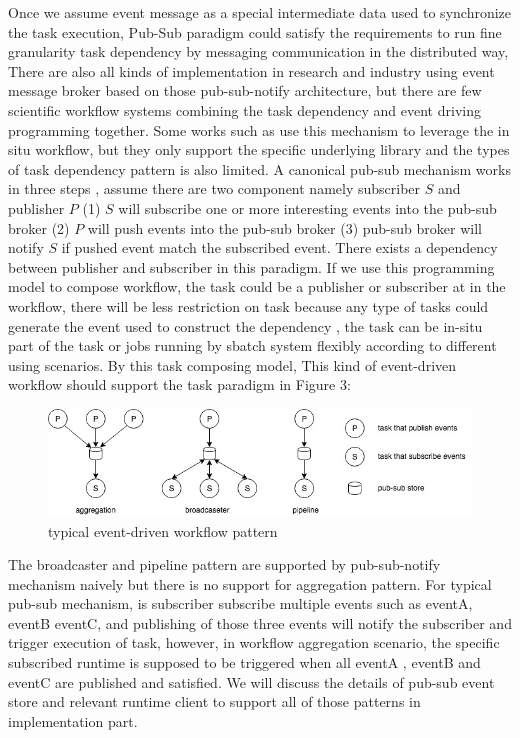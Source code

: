Once we assume event message as a special intermediate data used to synchronize the task execution, Pub-Sub paradigm \cite{eugster2003many} could satisfy the requirements to run fine granularity task dependency by messaging communication in the distributed way, There are also all kinds of implementation in research and industry using event message broker based on those pub-sub-notify architecture\cite{hivemq,jin2012scalable,redispubsub}, but there are few scientific workflow systems combining the task dependency and event driving programming together. Some works such as \cite{jin2012scalable} use this mechanism to leverage the in situ workflow, but they only support the specific underlying library and the types of task dependency pattern is also limited. A canonical pub-sub mechanism works in three steps , assume there are two component namely subscriber $S$ and publisher $P$ (1) $S$ will subscribe one or more interesting events into the pub-sub broker (2) $P$ will push events into the pub-sub broker (3)  pub-sub broker will notify $S$ if pushed event match the subscribed event. There exists a dependency between publisher and subscriber in this paradigm. If we use this programming model to compose workflow, the task could be a publisher or subscriber at in the workflow, there will be less restriction on task because any type of tasks could generate the event used to construct the dependency , the task can be in-situ part of the task or jobs running by sbatch system flexibly according to different using scenarios. By this task composing model,  This kind of event-driven workflow should support the task paradigm in Figure 3:
\begin{figure} 
\centering
\includegraphics[width=.8\linewidth]{./figure/edtaskpattern.jpg}
\caption{typical event-driven workflow pattern}
 \label{fg:state}
\end{figure} 

The broadcaster and pipeline pattern are supported by pub-sub-notify mechanism naively but there is no support for aggregation pattern. For typical pub-sub mechanism, is subscriber subscribe multiple events such as eventA, eventB eventC, and publishing of those three events will notify the subscriber and trigger execution of task, however, in workflow aggregation scenario, the specific subscribed runtime is supposed to be triggered when all eventA , eventB and eventC are published and satisfied. We will discuss the details of pub-sub event store and relevant runtime client to support all of those patterns in implementation part. 
